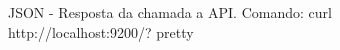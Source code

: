 \begin{figure}[!htb]
        \caption{\label{pretty}JSON - Resposta da chamada a API. Comando: curl http://localhost:9200/?   pretty}
        \begin{center}
        \end{center}
\end{figure}

